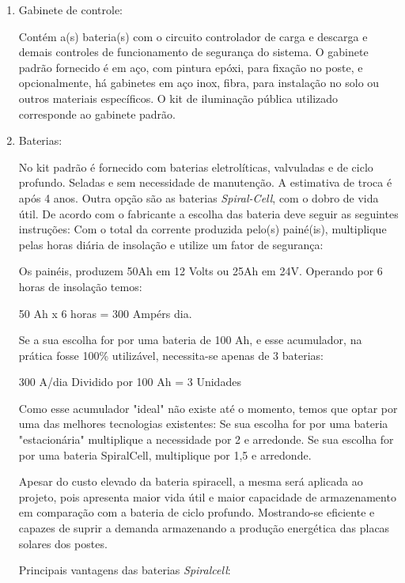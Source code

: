\begin{enumerate}
	\item Gabinete de controle:
	
	Contém a(s) bateria(s) com o circuito controlador de carga e descarga e demais controles de funcionamento de segurança do sistema. O gabinete padrão fornecido é em aço, com pintura epóxi, para fixação no poste, e opcionalmente, há gabinetes em aço inox, fibra, para instalação no solo ou outros materiais específicos. O kit de iluminação pública utilizado corresponde ao gabinete padrão. 
	
	\item Baterias:
	
	No kit padrão é fornecido com baterias eletrolíticas, valvuladas e de ciclo profundo. Seladas e sem necessidade de manutenção. A estimativa de troca é após 4 anos. Outra opção são as baterias \textit{Spiral-Cell}, com o dobro de vida útil. 
De acordo com o fabricante a escolha das bateria deve seguir as seguintes instruções:
Com o total da corrente produzida pelo(s) painé(is), multiplique pelas horas diária de insolação e utilize um fator de segurança:
 
	Os painéis, produzem 50Ah em 12 Volts ou 25Ah em 24V.
Operando por 6 horas de insolação temos:

\begin{center}
	50 Ah x 6 horas = 300 Ampérs dia.
\end{center}
  
	Se a sua escolha for por uma bateria de 100 Ah, e esse acumulador, na prática fosse 100\% utilizável, necessita-se apenas de 3 baterias:

\begin{center}
 300 A/dia Dividido por 100 Ah = 3 Unidades
\end{center}  
 
	Como esse acumulador "ideal" não existe até o momento, temos que optar por uma das melhores tecnologias existentes:
Se sua escolha for por uma bateria  "estacionária" multiplique a necessidade por 2 e arredonde.
Se sua escolha for por uma bateria SpiralCell, multiplique por 1,5 e arredonde.

	Apesar  do custo elevado da bateria spiracell, a mesma será aplicada ao projeto, pois apresenta maior vida útil e maior  capacidade de armazenamento em comparação com a bateria de ciclo profundo. Mostrando-se eficiente e capazes de suprir a demanda armazenando a produção energética das placas solares dos postes.

	Principais vantagens das baterias \textit{Spiralcell}:
	

\end{enumerate}
